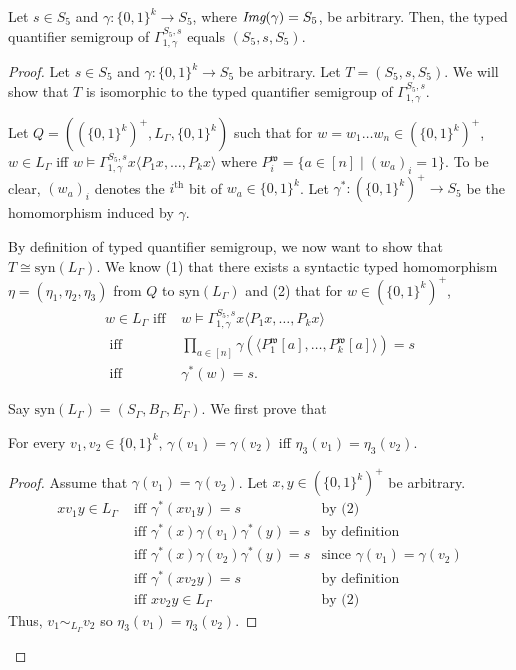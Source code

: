 \documentclass[a4paper,UKenglish,cleveref, autoref, thm-restate, anonymous]{lipics-v2021}
\begin{document}
\begin{theorem}\label{thm:typedquantifiersemigroup}
    Let $s \in S_5$ and $\gamma : \{0,1\}^k \rightarrow S_5$, where $\emph{Img}(\gamma) = S_5$, be arbitrary. Then, the typed quantifier semigroup of $\Gamma^{S_5,s}_{1,\gamma}$ equals $(S_5, s, S_5)$.
\end{theorem}
\begin{proof}
    Let $s \in S_5$ and $\gamma : \{0,1\}^k \rightarrow S_5$ be arbitrary. Let $T = (S_5, s, S_5)$. We will show that $T$ is isomorphic to the typed quantifier semigroup of $\Gamma^{S_5,s}_{1,\gamma}$.

    Let $Q = ((\{0,1\}^k)^+, L_\Gamma, \{0,1\}^k)$ such that for $w = w_1\dots w_n \in (\{0,1\}^k)^+$, $w \in L_\Gamma$ iff $w \models \Gamma^{S_5,s}_{1,\gamma}x\langle P_1 x, \dots, P_k x\rangle$ where $P_i^\mathfrak{w} = \{a \in [n] \mid (w_a)_i = 1\}$. To be clear, $(w_a)_i$ denotes the $i^\text{th}$ bit of $w_a \in \{0,1\}^k$. Let $\gamma^* : (\{0,1\}^k)^+ \rightarrow S_5$ be the homomorphism induced by $\gamma$.

    By definition of typed quantifier semigroup, we now want to show that $T \cong \text{syn}(L_\Gamma)$. We know (1) that there exists a syntactic typed homomorphism $\eta = (\eta_1, \eta_2, \eta_3)$ from $Q$ to $\text{syn}(L_\Gamma)$ and (2) that for $w \in (\{0,1\}^k)^+$,
    \begin{align*}
        w \in L_\Gamma \text{ iff } &w \models \Gamma^{S_5,s}_{1,\gamma}x\langle P_1 x, \dots, P_k x\rangle\\
        \text{ iff } &\prod_{a \in [n]} \gamma(\langle P_1^\mathfrak{w}[a], \dots, P_k^\mathfrak{w}[a]\rangle) = s\\
        \text{ iff } &\gamma^*(w) = s.
    \end{align*}

    Say $\text{syn}(L_\Gamma) = (S_\Gamma, B_\Gamma, E_\Gamma)$. We first prove that
    \begin{lemma}\label{lem:multtoalghelper}
        For every $v_1,v_2 \in \{0,1\}^k$, $\gamma(v_1) = \gamma(v_2)$ iff $\eta_3(v_1) = \eta_3(v_2)$.
    \end{lemma}
    \begin{proof}
        Assume that $\gamma(v_1) = \gamma(v_2)$. Let $x,y \in (\{0,1\}^k)^+$ be arbitrary. 
        \begin{align*}
            xv_1y \in L_\Gamma &\text{ iff } \gamma^*(xv_1y) = s&\text{by (2)}\\
            &\text{ iff } \gamma^*(x)\gamma(v_1)\gamma^*(y) = s&\text{by definition}\\
            &\text{ iff } \gamma^*(x)\gamma(v_2)\gamma^*(y) = s&\text{since $\gamma(v_1) = \gamma(v_2)$}\\
            &\text{ iff } \gamma^*(xv_2y) = s&\text{by definition}\\
            &\text{ iff } xv_2y \in L_\Gamma&\text{by (2)}
        \end{align*}
        Thus, $v_1 \sim_{L_\Gamma} v_2$ so $\eta_3(v_1) = \eta_3(v_2)$.


\end{proof}
\end{proof}
\end{document}
